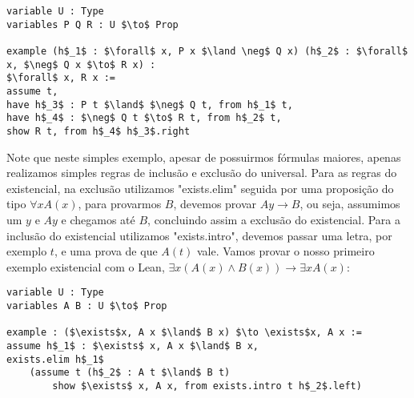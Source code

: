 \begin{lstlisting}
variable U : Type
variables P Q R : U $\to$ Prop

example (h$_1$ : $\forall$ x, P x $\land \neg$ Q x) (h$_2$ : $\forall$ x, $\neg$ Q x $\to$ R x) :
$\forall$ x, R x :=
assume t,
have h$_3$ : P t $\land$ $\neg$ Q t, from h$_1$ t,
have h$_4$ : $\neg$ Q t $\to$ R t, from h$_2$ t,
show R t, from h$_4$ h$_3$.right
\end{lstlisting}
Note que neste simples exemplo, apesar de possuirmos fórmulas maiores, apenas realizamos simples regras de inclusão e exclusão
do universal.
\newline Para as regras do existencial, na exclusão utilizamos "exists.elim" seguida por uma proposição do tipo $\forall x A(x)$,
para provarmos $B$, devemos provar $ A y \to B$, ou seja, assumimos um $y$ e $A y$ e chegamos até $B$, concluindo assim a exclusão
do existencial. Para a inclusão do existencial utilizamos "exists.intro", devemos passar uma letra, por exemplo $t$, e uma prova
de que $A(t)$ vale.
\newline Vamos provar o nosso primeiro exemplo existencial com o Lean, $\exists x (A(x) \land B(x)) \to \exists x A(x)$:
\begin{lstlisting}
variable U : Type
variables A B : U $\to$ Prop

example : ($\exists$x, A x $\land$ B x) $\to \exists$x, A x :=
assume h$_1$ : $\exists$ x, A x $\land$ B x,
exists.elim h$_1$
    (assume t (h$_2$ : A t $\land$ B t)
        show $\exists$ x, A x, from exists.intro t h$_2$.left) 
\end{lstlisting}